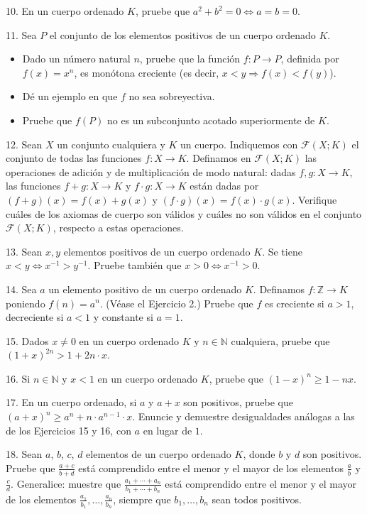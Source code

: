 \documentclass[12pt,oneside]{book}
\begin{document}
10. En un cuerpo ordenado \( K \), pruebe que \( a^2 + b^2 = 0 \Leftrightarrow a = b = 0 \).

11. Sea \( P \) el conjunto de los elementos positivos de un cuerpo ordenado \( K \).
\begin{itemize}
    \item [i)] Dado un número natural \( n \), pruebe que la función \( f: P \to P \), definida por \( f(x) = x^n \), es monótona creciente (es decir, \( x < y \Rightarrow f(x) < f(y) \)).
    \item [ii)] Dé un ejemplo en que \( f \) no sea sobreyectiva.
    \item [iii)] Pruebe que \( f(P) \) no es un subconjunto acotado superiormente de \( K \).
\end{itemize}

12. Sean \( X \) un conjunto cualquiera y \( K \) un cuerpo. Indiquemos con \( \mathcal{F}(X; K) \) el conjunto de todas las funciones \( f: X \to K \). Definamos en \( \mathcal{F}(X; K) \) las operaciones de adición y de multiplicación de modo natural: dadas \( f, g: X \to K \), las funciones \( f + g: X \to K \) y \( f \cdot g: X \to K \) están dadas por \( (f + g)(x) = f(x) + g(x) \) y \( (f \cdot g)(x) = f(x) \cdot g(x) \). Verifique cuáles de los axiomas de cuerpo son válidos y cuáles no son válidos en el conjunto \( \mathcal{F}(X; K) \), respecto a estas operaciones.

13. Sean \( x, y \) elementos positivos de un cuerpo ordenado \( K \). Se tiene \( x < y \Leftrightarrow x^{-1} > y^{-1} \). Pruebe también que \( x > 0 \Leftrightarrow x^{-1} > 0 \).

14. Sea \(a\) un elemento positivo de un cuerpo ordenado \(K\). Definamos \(f: \mathbb{Z} \to K\) poniendo \(f(n) = a^n\). (Véase el Ejercicio 2.) Pruebe que \(f\) es creciente si \(a > 1\), decreciente si \(a < 1\) y constante si \(a = 1\).

15. Dados \(x \neq 0\) en un cuerpo ordenado \(K\) y \(n \in \mathbb{N}\) cualquiera, pruebe que \((1+x)^{2n} > 1 + 2n \cdot x\).

16. Si \(n \in \mathbb{N}\) y \(x < 1\) en un cuerpo ordenado \(K\), pruebe que \((1-x)^n \geq 1 - nx\).

17. En un cuerpo ordenado, si \(a\) y \(a + x\) son positivos, pruebe que \((a+x)^n \geq a^n + n \cdot a^{n-1} \cdot x\). Enuncie y demuestre desigualdades análogas a las de los Ejercicios 15 y 16, con \(a\) en lugar de \(1\).

18. Sean \(a\), \(b\), \(c\), \(d\) elementos de un cuerpo ordenado \(K\), donde \(b\) y \(d\) son positivos. Pruebe que \(\frac{a+c}{b+d}\) está comprendido entre el menor y el mayor de los elementos \(\frac{a}{b}\) y \(\frac{c}{d}\). Generalice: muestre que \(\frac{a_1 + \cdots + a_n}{b_1 + \cdots + b_n}\) está comprendido entre el menor y el mayor de los elementos \(\frac{a_1}{b_1}, \dots, \frac{a_n}{b_n}\), siempre que \(b_1, \ldots, b_n\) sean todos positivos.
\end{document}
